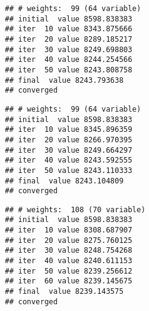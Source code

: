 \documentclass[
]{article}
\newenvironment{Shaded}{\begin{snugshade}}{\end{snugshade}}
\newcommand{\DataTypeTok}[1]{\textcolor[rgb]{0.13,0.29,0.53}{#1}}
\newcommand{\DecValTok}[1]{\textcolor[rgb]{0.00,0.00,0.81}{#1}}
\newcommand{\KeywordTok}[1]{\textcolor[rgb]{0.13,0.29,0.53}{\textbf{#1}}}
\newcommand{\NormalTok}[1]{#1}
\newcommand{\OperatorTok}[1]{\textcolor[rgb]{0.81,0.36,0.00}{\textbf{#1}}}
\newcommand{\StringTok}[1]{\textcolor[rgb]{0.31,0.60,0.02}{#1}}
\begin{document}
\begin{verbatim}
## # weights:  99 (64 variable)
## initial  value 8598.838383 
## iter  10 value 8343.875666
## iter  20 value 8289.185217
## iter  30 value 8249.698803
## iter  40 value 8244.254566
## iter  50 value 8243.808758
## final  value 8243.793638 
## converged
\end{verbatim}

\begin{Shaded}
\end{Shaded}

\begin{verbatim}
## # weights:  99 (64 variable)
## initial  value 8598.838383 
## iter  10 value 8345.896359
## iter  20 value 8266.970395
## iter  30 value 8249.664297
## iter  40 value 8243.592555
## iter  50 value 8243.110333
## final  value 8243.104809 
## converged
\end{verbatim}

\begin{Shaded}
\end{Shaded}

\begin{verbatim}
## # weights:  108 (70 variable)
## initial  value 8598.838383 
## iter  10 value 8308.687907
## iter  20 value 8275.760125
## iter  30 value 8248.754268
## iter  40 value 8240.611153
## iter  50 value 8239.256612
## iter  60 value 8239.145675
## final  value 8239.143575 
## converged
\end{verbatim}
\end{document}
